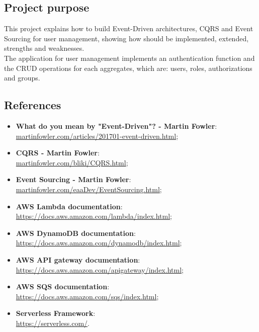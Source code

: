 \subsection{Project purpose}
This project explains how to build Event-Driven architectures, CQRS and Event Sourcing for user management, showing how should be implemented, extended, strengths and weaknesses.\\
The application for user management implements an authentication function and the CRUD operations for each aggregates, which are: users, roles, authorizations and groups.

\subsection{References}
\begin{itemize}
	\item \textbf{What do you mean by "Event-Driven"? - Martin Fowler}:\\ \url{martinfowler.com/articles/201701-event-driven.html};
	\item \textbf{CQRS - Martin Fowler}:\\ \url{martinfowler.com/bliki/CQRS.html};
	\item \textbf{Event Sourcing - Martin Fowler}:\\ \url{martinfowler.com/eaaDev/EventSourcing.html};
	\item \textbf{AWS Lambda documentation}:\\ \url{https://docs.aws.amazon.com/lambda/index.html};
	\item \textbf{AWS DynamoDB documentation}:\\ \url{https://docs.aws.amazon.com/dynamodb/index.html};
	\item \textbf{AWS API gateway documentation}:\\ \url{https://docs.aws.amazon.com/apigateway/index.html};
	\item \textbf{AWS SQS documentation}:\\ \url{https://docs.aws.amazon.com/sqs/index.html};
	\item \textbf{Serverless Framework}:\\ \url{https://serverless.com/}.
	
\end{itemize}
\pagebreak
